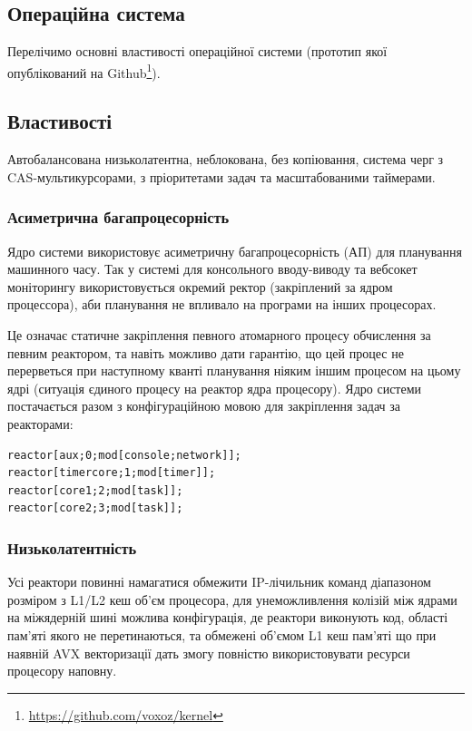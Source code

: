 \subsection{Операційна система}
Перелічимо основні властивості операційної системи (прототип
якої опублікований на Github\footnote{\url{https://github.com/voxoz/kernel}}).

\subsection{Властивості}
Автобалансована низьколатентна, неблокована, без копіювання, система черг
з CAS-мультикурсорами, з пріоритетами задач та масштабованими таймерами.

\subsubsection{Асиметрична багапроцесорність}
Ядро системи використовує асиметричну багапроцесорність (АП)
для планування машинного часу. Так у системі для консольного
вводу-виводу та вебсокет моніторингу використовується окремий
ректор (закріплений за ядром процессора),
аби планування не впливало на програми на інших процесорах.

\newpage
Це означає статичне закріплення певного атомарного процесу
обчислення за певним реактором, та навіть можливо дати гарантію, що
цей процес не перерветься при наступному кванті планування
ніяким іншим процесом на цьому ядрі (ситуація єдиного процесу
на реактор ядра процесору). Ядро системи постачається разом з конфігураційною
мовою для закріплення задач за реакторами:

\begin{lstlisting}
reactor[aux;0;mod[console;network]];
reactor[timercore;1;mod[timer]];
reactor[core1;2;mod[task]];
reactor[core2;3;mod[task]];
\end{lstlisting}

\subsubsection{Низьколатентність}
Усі реактори повинні намагатися обмежити IP-лічильник команд
діапазоном розміром з L1/L2 кеш об'єм процесора, для унеможливлення
колізій між ядрами на міжядерній шині можлива конфігурація, де
реактори виконують код, області пам'яті якого не перетинаються,
та обмежені об'ємом L1 кеш пам'яті що при наявній AVX векторизації
дать змогу повністю використовувати ресурси процесору наповну.

